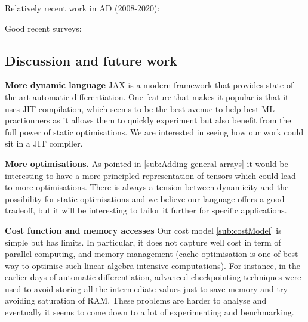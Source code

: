 Relatively recent work in AD (2008-2020):
\cite{mak2020differential,elliotthigher,vytiniotis2019differentiable,innes2018don,baydin2017automatic,huot2020correctness,gallagher-sdg,manzyuk2012confusion,wang2018demystifying,beck1994if,wang2018backpropagation,betancourt2018geometric,elliott2018simple,carpenter2015stan,paszke2017automatic,shaikhha2019efficient,innes2019zygote,griewank2008evaluating,kucukelbir2017automatic,brunel2019backpropagation,barthe2020versatility,abadi2019simple,cockett2019reverse,van2018automatic,hascoet2013tapenade,abadi2016tensorflow,pearlmutter2008reverse,bergstra2010theano,fong2019backprop,ehrhard2003differential,agrawal2019tensorflow,bettencourt2019taylor,cruttwell2017cartesian,manzyuk2012simply,laue2018computing,bernstein2020differentiating}

Good recent surveys: \cite{van2018automatic,baydin2017automatic}

\subsection{Discussion and future work} %
\label{sub:discussion_and_future_work}

\noindent \textbf{More dynamic language}
JAX \cite{bradbury2020jax,frostig2018compiling} is a modern framework that provides state-of-the-art automatic differentiation. 
One feature that makes it popular is that it uses JIT compilation, 
which seems to be the best avenue to help best ML practionners as it allows them 
to quickly experiment but also benefit from the full power of static optimisations.
We are interested in seeing how our work could sit in a JIT compiler. 

\noindent \textbf{More optimisations.}
As pointed in \ref{sub:Adding general arrays} it would be interesting to have a more principled representation 
of tensors which could lead to more optimisations. 
There is always a tension between dynamicity and the possibility for static optimisations 
and we believe our language offers a good tradeoff, but it will be interesting to tailor it 
further for specific applications.

\noindent \textbf{Cost function and memory accesses}
Our cost model \ref{sub:costModel} is simple but has limits. 
In particular, it does not capture well cost in term of
parallel computing, and memory management (cache optimisation is one of best way to optimise such linear algebra intensive computations).
For instance, in the earlier days of automatic differentiation, 
advanced checkpointing techniques were used to avoid storing all the intermediate values just to save memory 
and try avoiding saturation of RAM. 
These problems are harder to analyse and eventually it seems to come down to a lot of experimenting and benchmarking.

